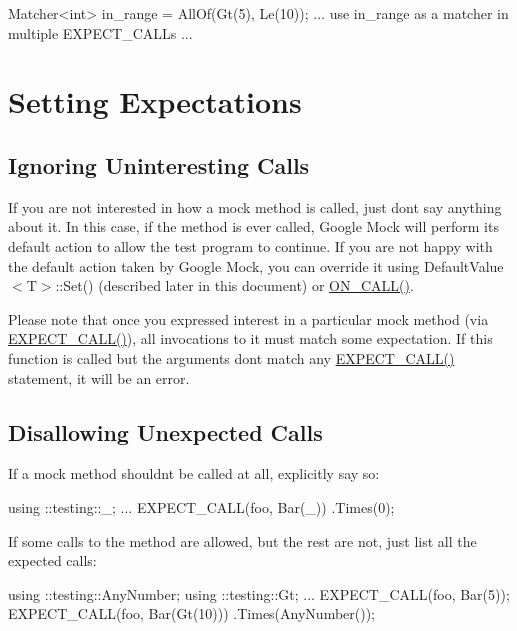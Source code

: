 \begin{DoxyCode}
Matcher<int> in\_range = AllOf(Gt(5), Le(10));
... use in\_range as a matcher in multiple EXPECT\_CALLs ...
\end{DoxyCode}


\section*{Setting Expectations}

\subsection*{Ignoring Uninteresting Calls}

If you are not interested in how a mock method is called, just don\textquotesingle{}t say anything about it. In this case, if the method is ever called, Google Mock will perform its default action to allow the test program to continue. If you are not happy with the default action taken by Google Mock, you can override it using {\ttfamily Default\+Value$<$T$>$\+::\+Set()} (described later in this document) or {\ttfamily \hyperlink{gmock-spec-builders_8h_a5b12ae6cf84f0a544ca811b380c37334}{O\+N\+\_\+\+C\+A\+L\+L()}}.

Please note that once you expressed interest in a particular mock method (via {\ttfamily \hyperlink{gmock-spec-builders_8h_a535a6156de72c1a2e25a127e38ee5232}{E\+X\+P\+E\+C\+T\+\_\+\+C\+A\+L\+L()}}), all invocations to it must match some expectation. If this function is called but the arguments don\textquotesingle{}t match any {\ttfamily \hyperlink{gmock-spec-builders_8h_a535a6156de72c1a2e25a127e38ee5232}{E\+X\+P\+E\+C\+T\+\_\+\+C\+A\+L\+L()}} statement, it will be an error.

\subsection*{Disallowing Unexpected Calls}

If a mock method shouldn\textquotesingle{}t be called at all, explicitly say so\+:


\begin{DoxyCode}
using ::testing::\_;
...
  EXPECT\_CALL(foo, Bar(\_))
      .Times(0);
\end{DoxyCode}


If some calls to the method are allowed, but the rest are not, just list all the expected calls\+:


\begin{DoxyCode}
using ::testing::AnyNumber;
using ::testing::Gt;
...
  EXPECT\_CALL(foo, Bar(5));
  EXPECT\_CALL(foo, Bar(Gt(10)))
      .Times(AnyNumber());
\end{DoxyCode}



